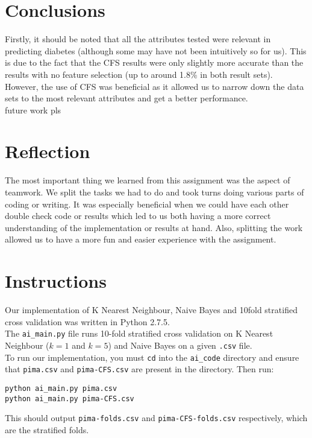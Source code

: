 \documentclass{article}
\renewcommand{\tt}{\texttt}
\begin{document}
\section{Conclusions}
Firstly, it should be noted that all the attributes tested were relevant in predicting diabetes (although some may have not been intuitively so for us). This is due to the fact that the CFS results were only slightly more accurate than the results with no feature selection (up to around 1.8\% in both result sets). However, the use of CFS was beneficial as it allowed us to narrow down the data sets to the most relevant attributes and get a better performance.  \\

future work pls

\section{Reflection}
The most important thing we learned from this assignment was the aspect of teamwork. We split the tasks we had to do and took turns doing various parts of coding or writing. It was especially beneficial when we could have each other double check code or results which led to us both having a more correct understanding of the implementation or results at hand. Also, splitting the work allowed us to have a more fun and easier experience with the assignment.

\section{Instructions}
Our implementation of K Nearest Neighbour, Naive Bayes and 10\-fold stratified cross validation was written in Python 2.7.5.\\

The \tt{ai\_main.py} file runs 10-fold stratified cross validation on K Nearest Neighbour ($k=1$ and $k=5$) and Naive Bayes on a given \tt{.csv} file.\\

To run our implementation, you must \tt{cd} into the \tt{ai\_code} directory and ensure that \tt{pima.csv} and \tt{pima-CFS.csv} are present in the directory. Then run:
\begin{lstlisting}
python ai_main.py pima.csv
python ai_main.py pima-CFS.csv
\end{lstlisting}

This should output \tt{pima-folds.csv} and \tt{pima-CFS-folds.csv} respectively, which are the stratified folds.
\end{document}
